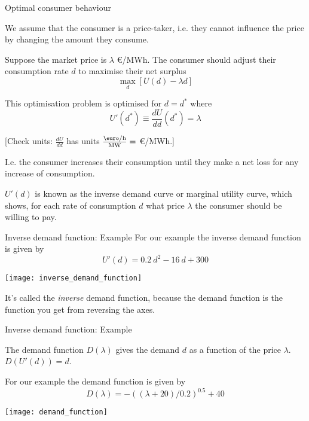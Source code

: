 \documentclass[10pt,dvipsnames]{beamer}
\def\l{\lambda}
\begin{document}
\begin{frame}{Optimal consumer behaviour}



  We assume that the consumer is a \alert{price-taker},
  i.e. they cannot influence the price by changing the amount they
  consume.

  Suppose the market price is $\lambda$ \euro/MWh. The consumer should
  adjust their consumption rate $d$ to maximise their \alert{net surplus}
  \begin{equation*}
    \max_d \left[U(d) - \l d \right]
  \end{equation*}

  This optimisation problem is optimised for $d=d^*$ where
  \begin{equation*}
    U'(d^*) \equiv \frac{dU}{dd} (d^*) =  \l
  \end{equation*}

  [Check units: $\frac{dU}{dd}$ has units $\frac{\textrm{\euro/h}}{\textrm{MW}} = $ \euro/MWh.]

  I.e. the consumer increases their consumption until they make a net loss for any increase of consumption.

  $U'(d)$ is known as the \alert{inverse demand curve} or \alert{marginal utility curve}, which shows,
  for each rate of consumption $d$ what price $\l$ the consumer should be
  willing to pay.


\end{frame}



\begin{frame}{Inverse demand function: Example}
  For our example the inverse demand function is given by
  \begin{equation*}
    U'(d) = 0.2~d^2 - 16~d + 300
  \end{equation*}

  \centering
  \texttt{[image: inverse\_demand\_function]}

  \raggedright
  It's called the \emph{inverse} demand function, because the demand function is the function you get from reversing the axes.
\end{frame}


\begin{frame}{Inverse demand function: Example}


  The \alert{demand function} $D(\l)$ gives the demand $d$ as a function of the price $\l$. $D(U'(d)) = d$.

  For our example the demand function is given by
  \begin{equation*}
    D(\l) =  -((\l+20 )/0.2)^{0.5} +40
  \end{equation*}

  \centering
  \texttt{[image: demand\_function]}

\end{frame}
\end{document}

